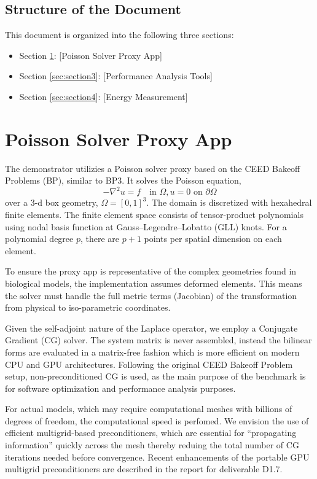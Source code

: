\documentclass[a4paper,12pt]{article}
\begin{document}
\subsection{{Structure of the Document}}

This document is organized into the following three sections:
\begin{itemize}
    \item Section \ref{sec:section2}: [Poisson Solver Proxy App]
    \item Section \ref{sec:section3}: [Performance Analysis Tools]
    \item Section \ref{sec:section4}: [Energy Measurement]
\end{itemize}

\newpage

\section{{Poisson Solver Proxy App}}
\label{sec:section2}

The demonstrator utilizies a Poisson solver proxy based on the CEED Bakeoff Problems (BP),
similar to BP3. It solves the Poisson equation,
$$
-\nabla^2 u = f \quad \text{in } \Omega, u = 0 \text{ on } \partial \Omega
$$
over a 3-d box geometry, $\Omega = [0,1]^3$.
The domain is discretized with hexahedral finite elements.
The finite element space consists of tensor-product polynomials using
nodal basis function at Gauss--Legendre--Lobatto (GLL) knots.
For a polynomial degree $p$, there are $p+1$ points per spatial dimension on each element.


To ensure the proxy app is representative of the complex geometries found in
biological models, the implementation assumes deformed elements.
This means the solver must handle the full metric terms (Jacobian)
of the transformation from physical to iso-parametric coordinates.

Given the self-adjoint nature of the Laplace operator, we employ a Conjugate Gradient (CG) solver.
The system matrix is never assembled, instead the bilinear forms are evaluated in
a matrix-free fashion which is more efficient on modern CPU and GPU architectures.
Following the original CEED Bakeoff Problem setup, non-preconditioned CG is used,
as the main purpose of the benchmark is for software optimization
and performance analysis purposes.

For actual models, which may require computational meshes with billions of degrees
of freedom, the computational speed is perfomed.
We envision the use of efficient multigrid-based preconditioners, which are
essential for ``propagating information'' quickly across the mesh thereby
reduing the total number of CG iterations needed before convergence.
Recent enhancements of the portable GPU multigrid preconditioners are
described in the report for deliverable D1.7.
\end{document}
